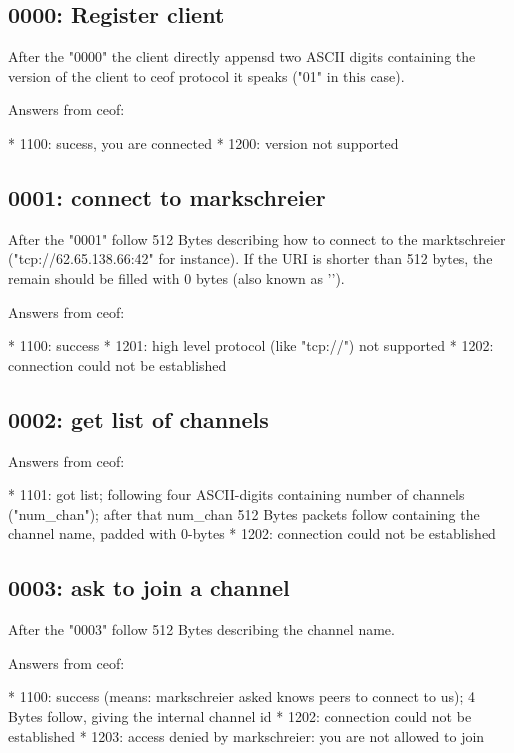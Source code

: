 \documentclass[12pt,a4paper]{article}
\begin{document}
\subsection{0000: Register client}

After the "0000" the client directly appensd two ASCII digits containing the version of the client to ceof protocol it speaks ("01" in this case).

Answers from ceof:

    * 1100: sucess, you are connected
    * 1200: version not supported


\subsection{0001: connect to markschreier}

After the "0001" follow 512 Bytes describing how to connect to the marktschreier ("tcp://62.65.138.66:42" for instance). If the URI is shorter than 512 bytes, the remain should be filled with 0 bytes (also known as '\0').

Answers from ceof:

    * 1100: success
    * 1201: high level protocol (like "tcp://") not supported
    * 1202: connection could not be established


\subsection{0002: get list of channels}

Answers from ceof:

    * 1101: got list; following four ASCII-digits containing number of channels ("num_chan"); after that  num_chan 512 Bytes packets follow containing the channel name, padded with 0-bytes
    * 1202: connection could not be established


\subsection{0003: ask to join a channel}

After the "0003" follow 512 Bytes describing the channel name.

Answers from ceof:

    * 1100: success (means: markschreier asked knows peers to connect to us); 4 Bytes follow, giving the internal channel id
    * 1202: connection could not be established
    * 1203: access denied by markschreier: you are not allowed to join
\end{document}
